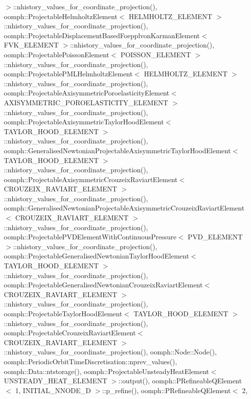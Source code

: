 $>$\+::nhistory\+\_\+values\+\_\+for\+\_\+coordinate\+\_\+projection(), oomph\+::\+Projectable\+Helmholtz\+Element$<$ H\+E\+L\+M\+H\+O\+L\+T\+Z\+\_\+\+E\+L\+E\+M\+E\+N\+T $>$\+::nhistory\+\_\+values\+\_\+for\+\_\+coordinate\+\_\+projection(), oomph\+::\+Projectable\+Displacement\+Based\+Foepplvon\+Karman\+Element$<$ F\+V\+K\+\_\+\+E\+L\+E\+M\+E\+N\+T $>$\+::nhistory\+\_\+values\+\_\+for\+\_\+coordinate\+\_\+projection(), oomph\+::\+Projectable\+Poisson\+Element$<$ P\+O\+I\+S\+S\+O\+N\+\_\+\+E\+L\+E\+M\+E\+N\+T $>$\+::nhistory\+\_\+values\+\_\+for\+\_\+coordinate\+\_\+projection(), oomph\+::\+Projectable\+P\+M\+L\+Helmholtz\+Element$<$ H\+E\+L\+M\+H\+O\+L\+T\+Z\+\_\+\+E\+L\+E\+M\+E\+N\+T $>$\+::nhistory\+\_\+values\+\_\+for\+\_\+coordinate\+\_\+projection(), oomph\+::\+Projectable\+Axisymmetric\+Poroelasticity\+Element$<$ A\+X\+I\+S\+Y\+M\+M\+E\+T\+R\+I\+C\+\_\+\+P\+O\+R\+O\+E\+L\+A\+S\+T\+I\+C\+I\+T\+Y\+\_\+\+E\+L\+E\+M\+E\+N\+T $>$\+::nhistory\+\_\+values\+\_\+for\+\_\+coordinate\+\_\+projection(), oomph\+::\+Projectable\+Axisymmetric\+Taylor\+Hood\+Element$<$ T\+A\+Y\+L\+O\+R\+\_\+\+H\+O\+O\+D\+\_\+\+E\+L\+E\+M\+E\+N\+T $>$\+::nhistory\+\_\+values\+\_\+for\+\_\+coordinate\+\_\+projection(), oomph\+::\+Generalised\+Newtonian\+Projectable\+Axisymmetric\+Taylor\+Hood\+Element$<$ T\+A\+Y\+L\+O\+R\+\_\+\+H\+O\+O\+D\+\_\+\+E\+L\+E\+M\+E\+N\+T $>$\+::nhistory\+\_\+values\+\_\+for\+\_\+coordinate\+\_\+projection(), oomph\+::\+Projectable\+Axisymmetric\+Crouzeix\+Raviart\+Element$<$ C\+R\+O\+U\+Z\+E\+I\+X\+\_\+\+R\+A\+V\+I\+A\+R\+T\+\_\+\+E\+L\+E\+M\+E\+N\+T $>$\+::nhistory\+\_\+values\+\_\+for\+\_\+coordinate\+\_\+projection(), oomph\+::\+Generalised\+Newtonian\+Projectable\+Axisymmetric\+Crouzeix\+Raviart\+Element$<$ C\+R\+O\+U\+Z\+E\+I\+X\+\_\+\+R\+A\+V\+I\+A\+R\+T\+\_\+\+E\+L\+E\+M\+E\+N\+T $>$\+::nhistory\+\_\+values\+\_\+for\+\_\+coordinate\+\_\+projection(), oomph\+::\+Projectable\+P\+V\+D\+Element\+With\+Continuous\+Pressure$<$ P\+V\+D\+\_\+\+E\+L\+E\+M\+E\+N\+T $>$\+::nhistory\+\_\+values\+\_\+for\+\_\+coordinate\+\_\+projection(), oomph\+::\+Projectable\+Generalised\+Newtonian\+Taylor\+Hood\+Element$<$ T\+A\+Y\+L\+O\+R\+\_\+\+H\+O\+O\+D\+\_\+\+E\+L\+E\+M\+E\+N\+T $>$\+::nhistory\+\_\+values\+\_\+for\+\_\+coordinate\+\_\+projection(), oomph\+::\+Projectable\+Generalised\+Newtonian\+Crouzeix\+Raviart\+Element$<$ C\+R\+O\+U\+Z\+E\+I\+X\+\_\+\+R\+A\+V\+I\+A\+R\+T\+\_\+\+E\+L\+E\+M\+E\+N\+T $>$\+::nhistory\+\_\+values\+\_\+for\+\_\+coordinate\+\_\+projection(), oomph\+::\+Projectable\+Taylor\+Hood\+Element$<$ T\+A\+Y\+L\+O\+R\+\_\+\+H\+O\+O\+D\+\_\+\+E\+L\+E\+M\+E\+N\+T $>$\+::nhistory\+\_\+values\+\_\+for\+\_\+coordinate\+\_\+projection(), oomph\+::\+Projectable\+Crouzeix\+Raviart\+Element$<$ C\+R\+O\+U\+Z\+E\+I\+X\+\_\+\+R\+A\+V\+I\+A\+R\+T\+\_\+\+E\+L\+E\+M\+E\+N\+T $>$\+::nhistory\+\_\+values\+\_\+for\+\_\+coordinate\+\_\+projection(), oomph\+::\+Node\+::\+Node(), oomph\+::\+Periodic\+Orbit\+Time\+Discretisation\+::nprev\+\_\+values(), oomph\+::\+Data\+::ntstorage(), oomph\+::\+Projectable\+Unsteady\+Heat\+Element$<$ U\+N\+S\+T\+E\+A\+D\+Y\+\_\+\+H\+E\+A\+T\+\_\+\+E\+L\+E\+M\+E\+N\+T $>$\+::output(), oomph\+::\+P\+Refineable\+Q\+Element$<$ 1, I\+N\+I\+T\+I\+A\+L\+\_\+\+N\+N\+O\+D\+E\+\_\+D $>$\+::p\+\_\+refine(), oomph\+::\+P\+Refineable\+Q\+Element$<$ 2, 